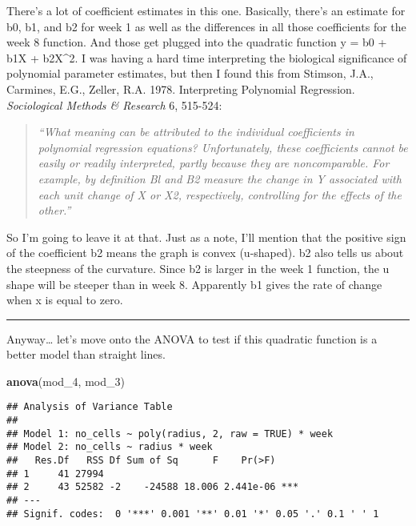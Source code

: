 \documentclass[]{article}
\newenvironment{Shaded}{\begin{snugshade}}{\end{snugshade}}
\newcommand{\KeywordTok}[1]{\textcolor[rgb]{0.13,0.29,0.53}{\textbf{#1}}}
\newcommand{\DecValTok}[1]{\textcolor[rgb]{0.00,0.00,0.81}{#1}}
\newcommand{\NormalTok}[1]{#1}
\begin{document}
There's a lot of coefficient estimates in this one. Basically, there's
an estimate for b0, b1, and b2 for week 1 as well as the differences in
all those coefficients for the week 8 function. And those get plugged
into the quadratic function y = b0 + b1X + b2X\^{}2. I was having a hard
time interpreting the biological significance of polynomial parameter
estimates, but then I found this from Stimson, J.A., Carmines, E.G.,
Zeller, R.A. 1978. Interpreting Polynomial Regression.
\emph{Sociological Methods \& Research} 6, 515-524:

\begin{quote}
\emph{``What meaning can be attributed to the individual coefficients in
polynomial regression equations? Unfortunately, these coefficients
cannot be easily or readily interpreted, partly because they are
noncomparable. For example, by definition Bl and B2 measure the change
in Y associated with each unit change of X or X2, respectively,
controlling for the effects of the other.''}
\end{quote}

So I'm going to leave it at that. Just as a note, I'll mention that the
positive sign of the coefficient b2 means the graph is convex
(u-shaped). b2 also tells us about the steepness of the curvature. Since
b2 is larger in the week 1 function, the u shape will be steeper than in
week 8. Apparently b1 gives the rate of change when x is equal to zero.

\begin{center}\rule{0.5\linewidth}{\linethickness}\end{center}

Anyway\ldots{} let's move onto the ANOVA to test if this quadratic
function is a better model than straight lines.

\begin{Shaded}
\begin{Highlighting}[]
\KeywordTok{anova}\NormalTok{(mod_}\DecValTok{4}\NormalTok{, mod_}\DecValTok{3}\NormalTok{)}
\end{Highlighting}
\end{Shaded}

\begin{verbatim}
## Analysis of Variance Table
## 
## Model 1: no_cells ~ poly(radius, 2, raw = TRUE) * week
## Model 2: no_cells ~ radius * week
##   Res.Df   RSS Df Sum of Sq      F    Pr(>F)    
## 1     41 27994                                  
## 2     43 52582 -2    -24588 18.006 2.441e-06 ***
## ---
## Signif. codes:  0 '***' 0.001 '**' 0.01 '*' 0.05 '.' 0.1 ' ' 1
\end{verbatim}
\end{document}
